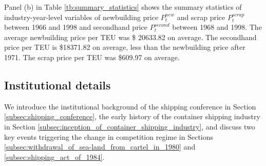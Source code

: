 \documentclass[11pt]{article}
\begin{document}
Panel (b) in Table \ref{tb:summary_statistics} shows the summary statistics of industry-year-level variables of newbuilding price $P_{t}^{new}$ and scrap price $P_{t}^{scrap}$ between 1966 and 1998 and secondhand price $P_{t}^{second}$ between 1968 and 1998. The average newbuilding price per TEU was \$ 20633.82 on average. The secondhand price per TEU is \$18371.82 on average, less than the newbuilding price after 1971. The scrap price per TEU was \$609.97 on average.

\subsection{Institutional details}\label{subsec:institutional_details}

We introduce the institutional background of the shipping conference in Section \ref{subsec:shipping_conference}, the early history of the container shipping industry in Section \ref{subsec:inception_of_container_shipping_industry}, and discuss two key events triggering the change in competition regime in Sections \ref{subsec:withdrawal_of_sea-land_from_cartel_in_1980} and \ref{subsec:shipping_act_of_1984}.
\end{document}
